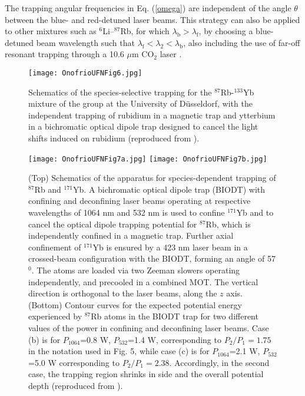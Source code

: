 \documentclass[pra,letterpaper,twocolumn,showpacs,superscriptaddress]{revtex4}
\begin{document}
The trapping angular frequencies in Eq. (\ref{omega}) are independent of the angle $\theta$ between the 
blue- and red-detuned laser beams. This strategy can also be applied to other mixtures such as 
$^6$Li--$^{87}$Rb, for which $\lambda_\mathrm{b} > \lambda_\mathrm{f}$, by choosing a blue-detuned beam 
wavelength such that $\lambda_\mathrm{f} < \lambda_2 < \lambda_\mathrm{b}$, also including the use of far-off 
resonant trapping through a 10.6 $\mu$m CO${}_2$ laser \cite{Onofrio2004}.

\begin{figure}[t] 
\begin{center}
\texttt{[image: OnofrioUFNFig6.jpg]}
\caption{Schematics of the species-selective trapping for the ${}^{87}$Rb-${}^{133}$Yb 
mixture of the group at the University of D\"usseldorf, with the independent trapping of 
rubidium in a magnetic trap and ytterbium in a bichromatic optical dipole trap designed 
to cancel the light shifts induced on rubidium (reproduced from \cite{Baumer2011}).}
\end{center}
\end{figure}

\begin{figure}[t]
\begin{center}
\texttt{[image: OnofrioUFNFig7a.jpg]}
\texttt{[image: OnofrioUFNFig7b.jpg]}
\caption{(Top) Schematics of the apparatus for species-dependent trapping of ${}^{87}$Rb and 
${}^{171}$Yb. A bichromatic optical dipole trap (BIODT) with confining and deconfining laser 
beams operating at respective wavelengths of 1064 nm and 532 nm is used to confine ${}^{171}$Yb 
and to cancel the optical dipole trapping potential for ${}^{87}$Rb, which is independently confined 
in a magnetic trap. Further axial confinement of ${}^{171}$Yb is ensured by a 423 nm laser beam 
in a crossed-beam configuration with the BIODT, forming an angle of 57${}^0$. The atoms are loaded 
via two Zeeman slowers operating independently, and precooled in a combined MOT.  
The vertical direction is orthogonal to the laser beams, along the $z$ axis.
(Bottom) Contour curves for the expected potential energy experienced by ${}^{87}$Rb atoms in the 
BIODT trap for two different values of the power in confining and deconfining laser beams. 
Case (b) is for $P_{1064}$=0.8 W, $P_{532}$=1.4 W, corresponding to $P_2/P_1=1.75$ in the notation 
used in Fig. 5, while case (c) is for $P_{1064}$=2.1 W, $P_{532}$=5.0 W corresponding to $P_2/P_1=2.38$. 
Accordingly, in the second case, the trapping region shrinks in side and the overall potential depth 
(reproduced from \cite{Vaidya2015}).}
\end{center}
\end{figure}
\end{document}
